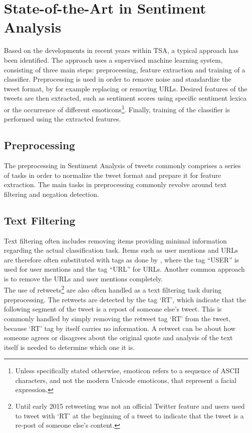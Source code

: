 \section{State-of-the-Art in Sentiment Analysis}
\label{sec:state_of_the_art}
Based on the developments in recent years within TSA, a typical approach has been identified. The approach uses a supervised machine learning system, consisting of three main steps: preprocessing, feature extraction and training of a classifier. Preprocessing is used in order to remove noise and standardize the tweet format, by for example replacing or removing URLs. Desired features of the tweets are then extracted, such as sentiment scores using specific sentiment lexica or the occurrence of different emoticons\footnote{Unless specifically stated otherwise, emoticon refers to a sequence of ASCII characters, and not the modern Unicode emoticons, that represent a facial expression.}. Finally, training of the classifier is performed using the extracted features.

\subsection{Preprocessing}
The preprocessing in Sentiment Analysis of tweets commonly comprises a series of tasks in order to normalize the tweet format and prepare it for feature extraction. The main tasks in preprocessing commonly revolve around text filtering and negation detection. 

\subsection*{Text Filtering}
Text filtering often includes removing items providing minimal information regarding the actual classification task. Items such as user mentions and URLs are therefore often substituted with tags as done by \cite{GoSentimentAnalysis09}, where the tag ``USER'' is used for user mentions and the tag ``URL'' for URLs. Another common approach is to remove the URLs and user mentions completely.\\

The use of retweets\footnote{Until early 2015 retweeting was not an official Twitter feature and users used to tweet with `RT' at the beginning of a tweet to indicate that the tweet is a re-post of someone else's content.} are also often handled as a text filtering task during preprocessing. The retweets are detected by the tag `RT', which indicate that the following segment of the tweet is a repost of someone else's tweet. This is commonly handled by simply removing the retweet tag `RT' from the tweet, because `RT' tag by itself carries no information. A retweet can be about how someone agrees or disagrees about the original quote and analysis of the text itself is needed to determine which one it is. \\

